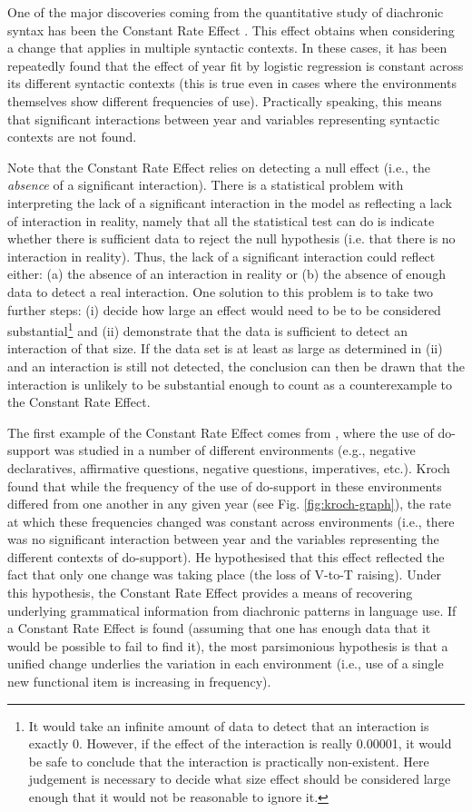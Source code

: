 	One of the major discoveries coming from the quantitative study of diachronic syntax has been the Constant Rate Effect \citep{Kroch.1989,Kroch.1994}. This effect obtains when considering a change that applies in multiple syntactic contexts. In these cases, it has been repeatedly found that the effect of year fit by logistic regression is constant across its different syntactic contexts (this is true even in cases where the environments themselves show different frequencies of use). Practically speaking, this means that significant interactions between year and variables representing syntactic contexts are not found.

	Note that the Constant Rate Effect relies on detecting a null effect (i.e., the \textit{absence} of a significant interaction). There is a statistical problem with interpreting the lack of a significant interaction in the model as reflecting a lack of interaction in reality, namely that all the statistical test can do is indicate whether there is sufficient data to reject the null hypothesis (i.e. that there is no interaction in reality). Thus, the lack of a significant interaction could reflect either: (a) the absence of an interaction in reality or (b) the absence of enough data to detect a real interaction. One solution to this problem is to take two further steps: (i) decide how large an effect would need to be to be considered substantial\footnote{It would take an infinite amount of data to detect that an interaction is exactly 0. However, if the effect of the interaction is really 0.00001, it would be safe to conclude that the interaction is practically non-existent. Here judgement is necessary to decide what size effect should be considered large enough that it would not be reasonable to ignore it.} and (ii) demonstrate that the data is sufficient to detect an interaction of that size. If the data set is at least as large as determined in (ii) and an interaction is still not detected, the conclusion can then be drawn that the interaction is unlikely to be substantial enough to count as a counterexample to the Constant Rate Effect.

	The first example of the Constant Rate Effect comes from \cite{Kroch.1989}, where the use of do-support was studied in a number of different environments (e.g., negative declaratives, affirmative questions, negative questions, imperatives, etc.). Kroch found that while the frequency of the use of do-support in these environments differed from one another in any given year (see Fig. \ref{fig:kroch-graph}), the rate at which these frequencies changed was constant across environments (i.e., there was no significant interaction between year and the variables representing the different contexts of do-support). He hypothesised that this effect reflected the fact that only one change was taking place (the loss of V-to-T raising). Under this hypothesis, the Constant Rate Effect provides a means of recovering underlying grammatical information from diachronic patterns in language use. If a Constant Rate Effect is found (assuming that one has enough data that it would be possible to fail to find it), the most parsimonious hypothesis is that a unified change underlies the variation in each environment (i.e., use of a single new functional item is increasing in frequency).

